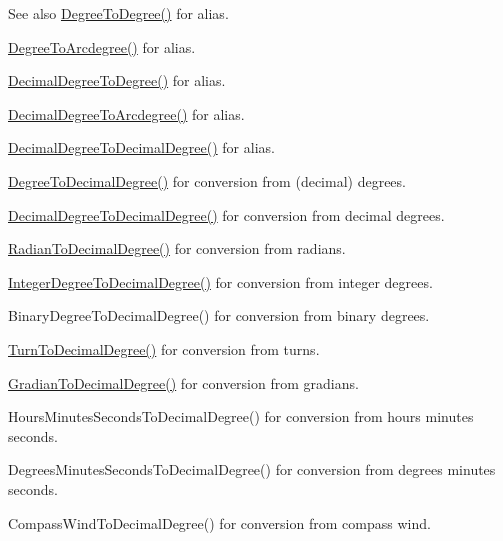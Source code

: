 \begin{DoxySeeAlso}{See also}
\mbox{\hyperlink{group___e_g_x_math-_angle_conversions-_degree_gaca157e7d3e99a46a11a04b92680d2574}{Degree\+To\+Degree()}} for alias. 

\mbox{\hyperlink{group___e_g_x_math-_angle_conversions-_degree_gac1b5f3b68f66c77a6df4ceef842c9b19}{Degree\+To\+Arcdegree()}} for alias. 

\mbox{\hyperlink{group___e_g_x_math-_angle_conversions-_decimal_degree_ga0aa7f2f5dbb00cf4ab303421c6e33ccf}{Decimal\+Degree\+To\+Degree()}} for alias. 

\mbox{\hyperlink{group___e_g_x_math-_angle_conversions-_decimal_degree_gacdd463fcabffeb598ebda65b012ce743}{Decimal\+Degree\+To\+Arcdegree()}} for alias. 

\mbox{\hyperlink{group___e_g_x_math-_angle_conversions-_decimal_degree_gafccf9cd779903872887978ab9d79661f}{Decimal\+Degree\+To\+Decimal\+Degree()}} for alias. 

\mbox{\hyperlink{group___e_g_x_math-_angle_conversions-_degree_ga568afc1d436d425bf5d4edea584aee08}{Degree\+To\+Decimal\+Degree()}} for conversion from (decimal) degrees. 

\mbox{\hyperlink{group___e_g_x_math-_angle_conversions-_decimal_degree_gafccf9cd779903872887978ab9d79661f}{Decimal\+Degree\+To\+Decimal\+Degree()}} for conversion from decimal degrees. 

\mbox{\hyperlink{group___e_g_x_math-_angle_conversions-_radian_ga6d170f1882c32de53167c04524d05f67}{Radian\+To\+Decimal\+Degree()}} for conversion from radians. 

\mbox{\hyperlink{group___e_g_x_math-_angle_conversions-_integer_degree_gac219c3198508ba984d8d81d22831b27d}{Integer\+Degree\+To\+Decimal\+Degree()}} for conversion from integer degrees. 

Binary\+Degree\+To\+Decimal\+Degree() for conversion from binary degrees. 

\mbox{\hyperlink{group___e_g_x_math-_angle_conversions-_turn_ga79231536255e77fb7a158b99a30c1767}{Turn\+To\+Decimal\+Degree()}} for conversion from turns. 

\mbox{\hyperlink{group___e_g_x_math-_angle_conversions-_gradian_ga346f47c519d5261b689cec49f4a8e789}{Gradian\+To\+Decimal\+Degree()}} for conversion from gradians. 

Hours\+Minutes\+Seconds\+To\+Decimal\+Degree() for conversion from hours minutes seconds. 

Degrees\+Minutes\+Seconds\+To\+Decimal\+Degree() for conversion from degrees minutes seconds. 

Compass\+Wind\+To\+Decimal\+Degree() for conversion from compass wind. 
\end{DoxySeeAlso}
\mbox{\label{group___e_g_x_math-_angle_conversions-_degree_gaca157e7d3e99a46a11a04b92680d2574}} 
